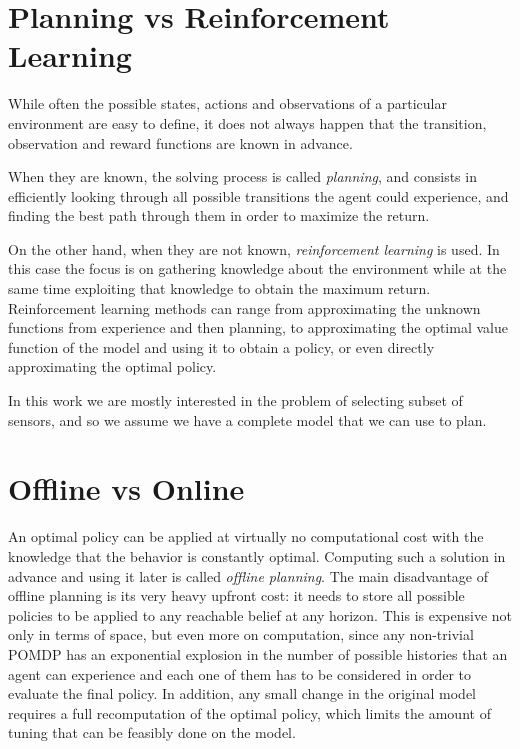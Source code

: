 \section{Planning vs Reinforcement Learning}\label{ref:solutions}

While often the possible states, actions and observations of a particular environment are easy to
define, it does not always happen that the transition, observation and reward functions are known in
advance.

When they are known, the solving process is called \textit{planning}, and consists in efficiently
looking through all possible transitions the agent could experience, and finding the best path
through them in order to maximize the return.

On the other hand, when they are not known, \textit{reinforcement learning} is used. In this case the
focus is on gathering knowledge about the environment while at the same time exploiting that
knowledge to obtain the maximum return. Reinforcement learning methods can range from approximating
the unknown functions from experience and then planning, to approximating the optimal value function
of the model and using it to obtain a policy, or even directly approximating the optimal policy.

In this work we are mostly interested in the problem of selecting subset of sensors, and so we
assume we have a complete model that we can use to plan.

\section{Offline vs Online}

An optimal policy can be applied at virtually no computational cost with the knowledge that the
behavior is constantly optimal. Computing such a solution in advance and using it later is called
\textit{offline planning}. The main disadvantage of offline planning is its very heavy upfront cost:
it needs to store all possible policies to be applied to any reachable belief at any horizon. This
is expensive not only in terms of space, but even more on computation, since any non-trivial POMDP
has an exponential explosion in the number of possible histories that an agent can experience and
each one of them has to be considered in order to evaluate the final policy. In addition, any small
change in the original model requires a full recomputation of the optimal policy, which limits the
amount of tuning that can be feasibly done on the model.

